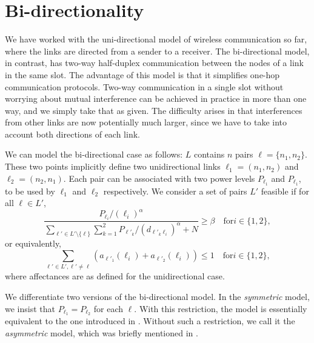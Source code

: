 \documentclass[11pt]{amsart}
\begin{document}
\section{Bi-directionality}
\label{sec:bidi}
We have worked with the uni-directional model of wireless communication so far, where the links are directed from
a sender to a receiver. The bi-directional model, in contrast, has
two-way half-duplex communication
between the nodes of a link in the same slot. The advantage of this model is that it simplifies one-hop communication protocols. Two-way communication in a single slot without worrying about mutual interference can be achieved in practice in more than one way,
and we simply take that as given. The difficulty arises in that interferences from other links are now potentially
much larger, since we have to take into account both directions of each link.

We can model the bi-directional case as follows: $L$ contains
$n$ pairs $\ell = \{n_1, n_2\}$. These two points implicitly define two unidirectional links $\ell_1 = (n_1, n_2)$ and $\ell_2 = (n_2, n_1)$. Each pair can be associated with two power levels $P_{\ell_1}$ and $P_{\ell_1}$, to be used by 
$\ell_1$ and $\ell_2$ respectively. We consider a set of pairs $L'$ feasible if for all $\ell \in L'$,
\[  \frac{P_{\ell_i}/(\ell_i)^\alpha}{\sum_{\ell' \in L' \setminus  \{\ell\}}   \sum_{k = 1}^2 P_{\ell'_k}/(d_{\ell'_k \ell_i})^\alpha + N} \ge \beta \quad \mathrm{for } i \in \{1, 2\}, \]
or equivalently,
\[ \sum_{\ell' \in L', \ell' \neq \ell} (a_{\ell'_1}(\ell_i) +
a_{\ell'_2}(\ell_i)) \leq 1 \quad \mathrm{for } i \in \{1, 2\}, \]
where affectances are as defined for the unidirectional case.

We differentiate two versions of the bi-directional model. In the \emph{symmetric} model, we insist that $P_{\ell_1} = P_{\ell_2}$
for each $\ell$. With this restriction, the model is essentially equivalent to the one
introduced in \cite{FKRV09}.
Without such a restriction,
we call it the \emph{asymmetric} model, which was briefly mentioned in \cite{KesselheimSoda11}.
\end{document}
